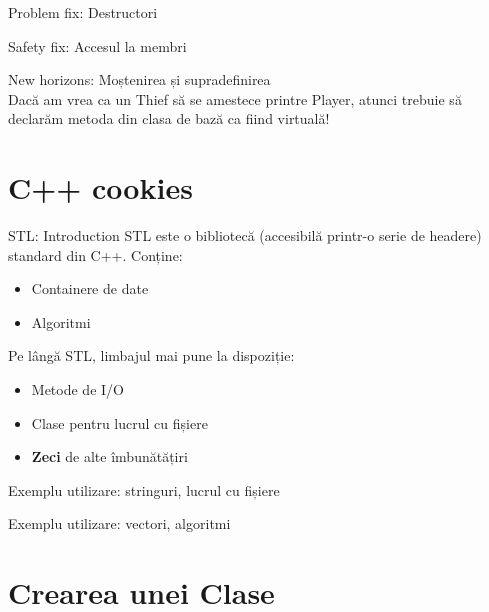\documentclass{beamer}
\begin{document}
    \begin{frame}{Problem fix: Destructori}
    \pause \\
    \end{frame}
    
    \begin{frame}{Safety fix: Accesul la membri}
    \pause \\
    \end{frame}
    
    \begin{frame}{New horizons: Moștenirea și supradefinirea}
    \pause \\
    \pause Dacă am vrea ca un Thief să se amestece printre Player, atunci trebuie să declarăm metoda din clasa de bază ca fiind virtuală!
    \end{frame}
    
\section{C++ cookies}
	\frame{\tableofcontents[currentsection]}
	\begin{frame}{STL: Introduction}
	STL este o bibliotecă (accesibilă printr-o serie de headere) standard din C++. \pause Conține: \pause
		\begin{itemize}
		\item Containere de date \pause
		\item Algoritmi \pause
		\end{itemize}
	Pe lângă STL, limbajul mai pune la dispoziție: \pause
		\begin{itemize}
		\item Metode de I/O \pause
		\item Clase pentru lucrul cu fișiere \pause
		\item {\bf Zeci} de alte îmbunătățiri
		\end{itemize}
	\end{frame}
	
	\begin{frame}{Exemplu utilizare: stringuri, lucrul cu fișiere}
	
	\end{frame}
	
	\begin{frame}{Exemplu utilizare: vectori, algoritmi}
	
	\end{frame}

\section{Crearea unei Clase}
    \frame{\tableofcontents[currentsection]}
\end{document}
